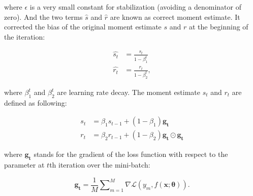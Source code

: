 \documentclass[
	parskip, 			   %
	twoside, 			   %
	DIV=14, 			   %
	BCOR=15.0mm, 		   %
	headsepline, 		   %
	open=right, 		   %
	captions=tableheading, %
	bibliography=totoc,    %
	numbers=noenddot       %
]{scrreprt}
\begin{document}
where $\epsilon$ is a very small constant for stabilization (avoiding a denominator of zero). And the two terms $\hat{s}$ and $\hat{r}$ are known as correct moment estimate. It corrected the bias of the original moment estimate $s$ and $r$ at the beginning of the iteration:

\begin{equation}
    \label{eq:correct_moment_estimate}
    \begin{aligned}
        \hat{s_t} &= \frac{s_t}{1-\beta_1^t}
        \\
        \hat{r_t} &= \frac{r_t}{1-\beta_2^t},
    \end{aligned}
\end{equation}

where $\beta_1^t$ and $\beta_2^t$ are learning rate decay. The moment estimate $s_t$ and $r_t$ are defined as following:

\begin{equation}
    \label{eq:moment_estimate}
    \begin{aligned}
        s_t &= \beta_1 s_{t-1} + (1-\beta_1) \mathbf{g_t}
        \\
        r_t &= \beta_2 r_{t-1} + (1-\beta_2) \mathbf{g_t} \odot \mathbf{g_t}
    \end{aligned}
\end{equation}

where $\mathbf{g_t}$ stands for the gradient of the loss function with respect to the parameter at $t$th iteration over the mini-batch:

\begin{equation}
    \label{eq:mean_gradient}
    \mathbf{g_t} = \frac{1}{M} \sum\nolimits_{m=1}^M \nabla \mathcal{L}\left( y_{m},f(\mathbf{x};\mathbf{\theta}) \right).
\end{equation}
 
\end{document}
